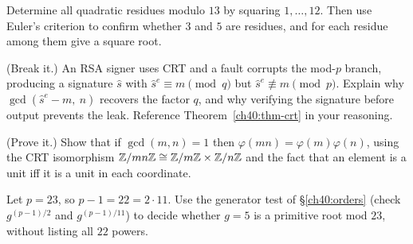 \begin{exercise}
\label{ch40:ex-qr}
Determine all quadratic residues modulo $13$ by squaring $1,\dots,12$. Then use Euler's criterion to
confirm whether $3$ and $5$ are residues, and for each residue among them give a square root.
\end{exercise}

\begin{exercise}
\label{ch40:ex-fault}
(Break it.) An RSA signer uses CRT and a fault corrupts the mod-$p$ branch, producing a signature
$\hat s$ with $\hat s^e\equiv m\pmod q$ but $\hat s^e\not\equiv m\pmod p$. Explain why
$\gcd(\hat s^e - m,\ n)$ recovers the factor $q$, and why verifying the signature before output
prevents the leak. Reference Theorem~\ref{ch40:thm-crt} in your reasoning.
\end{exercise}

\begin{exercise}
\label{ch40:ex-totient-prove}
(Prove it.) Show that if $\gcd(m,n)=1$ then $\varphi(mn)=\varphi(m)\varphi(n)$, using the CRT
isomorphism $\mathbb{Z}/mn\mathbb{Z}\cong\mathbb{Z}/m\mathbb{Z}\times\mathbb{Z}/n\mathbb{Z}$ and the fact that an element is a unit iff it is a unit
in each coordinate.
\end{exercise}

\begin{exercise}
\label{ch40:ex-primroot-test}
Let $p = 23$, so $p-1 = 22 = 2\cdot 11$. Use the generator test of \S\ref{ch40:orders} (check
$g^{(p-1)/2}$ and $g^{(p-1)/11}$) to decide whether $g=5$ is a primitive root mod $23$, without
listing all $22$ powers.
\end{exercise}
